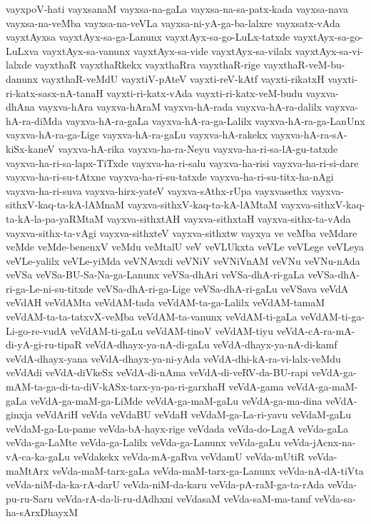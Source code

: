 {vayxpoV-hati
vayxsanaM
vayxsa-na-gaLa
vayxsa-na-sa-patx-kada
vayxsa-nava
vayxsa-na-veMba
vayxsa-na-veVLa
vayxsa-ni-yA-ga-ba-lalxre
vayxsatx-vAda
vayxtAyxsa
vayxtAyx-sa-ga-Lanunx
vayxtAyx-sa-go-LuLx-tatxde
vayxtAyx-sa-go-LuLxva
vayxtAyx-sa-vanunx
vayxtAyx-sa-vide
vayxtAyx-sa-vilalx
vayxtAyx-sa-vi-lalxde
vayxthaR
vayxthaRkekx
vayxthaRra
vayxthaR-rige
vayxthaR-veM-bu-danunx
vayxthaR-veMdU
vayxtiV-pAteV
vayxti-reV-kAtf
vayxti-rikatxH
vayxti-ri-katx-sasx-nA-tanaH
vayxti-ri-katx-vAda
vayxti-ri-katx-veM-budu
vayxva-dhAna
vayxva-hAra
vayxva-hAraM
vayxva-hA-rada
vayxva-hA-ra-dalilx
vayxva-hA-ra-diMda
vayxva-hA-ra-gaLa
vayxva-hA-ra-ga-Lalilx
vayxva-hA-ra-ga-LanUnx
vayxva-hA-ra-ga-Lige
vayxva-hA-ra-gaLu
vayxva-hA-rakekx
vayxva-hA-ra-sA-kiSx-kaneV
vayxva-hA-rika
vayxva-ha-ra-Neyu
vayxva-ha-ri-sa-lA-gu-tatxde
vayxva-ha-ri-sa-lapx-TiTxde
vayxva-ha-ri-salu
vayxva-ha-risi
vayxva-ha-ri-si-dare
vayxva-ha-ri-su-tAtxne
vayxva-ha-ri-su-tatxde
vayxva-ha-ri-su-titx-ha-nAgi
vayxva-ha-ri-suva
vayxva-hirx-yateV
vayxva-sAthx-rUpa
vayxvasethx
vayxva-sithxV-kaq-ta-kA-lAMnaM
vayxva-sithxV-kaq-ta-kA-lAMtaM
vayxva-sithxV-kaq-ta-kA-la-pa-yaRMtaM
vayxva-sithxtAH
vayxva-sithxtaH
vayxva-sithx-ta-vAda
vayxva-sithx-ta-vAgi
vayxva-sithxteV
vayxva-sithxtw
vayxya
ve
veMba
veMdare
veMde
veMde-benenxV
veMdu
veMtalU
veV
veVLUkxta
veVLe
veVLege
veVLeya
veVLe-yalilx
veVLe-yiMda
veVNAvxdi
veVNiV
veVNiVnAM
veVNu
veVNu-nAda
veVSa
veVSa-BU-Sa-Na-ga-Lanunx
veVSa-dhAri
veVSa-dhA-ri-gaLa
veVSa-dhA-ri-ga-Le-ni-su-titxde
veVSa-dhA-ri-ga-Lige
veVSa-dhA-ri-gaLu
veVSava
veVdA
veVdAH
veVdAMta
veVdAM-tada
veVdAM-ta-ga-Lalilx
veVdAM-tamaM
veVdAM-ta-ta-tatxvX-veMba
veVdAM-ta-vanunx
veVdAM-ti-gaLa
veVdAM-ti-ga-Li-go-re-vudA
veVdAM-ti-gaLu
veVdAM-tinoV
veVdAM-tiyu
veVdA-cA-ra-mA-di-yA-gi-ru-tipaR
veVdA-dhayx-ya-nA-di-gaLu
veVdA-dhayx-ya-nA-di-kamf
veVdA-dhayx-yana
veVdA-dhayx-ya-ni-yAda
veVdA-dhi-kA-ra-vi-lalx-veMdu
veVdAdi
veVdA-diVkeSx
veVdA-di-nAma
veVdA-di-veRV-da-BU-rapi
veVdA-ga-mAM-ta-ga-di-ta-diV-kASx-tarx-ya-pa-ri-garxhaH
veVdA-gama
veVdA-ga-maM-gaLa
veVdA-ga-maM-ga-LiMde
veVdA-ga-maM-gaLu
veVdA-ga-ma-dina
veVdA-ginxja
veVdAriH
veVda
veVdaBU
veVdaH
veVdaM-ga-La-ri-yavu
veVdaM-gaLu
veVdaM-ga-Lu-pame
veVda-bA-hayx-rige
veVdada
veVda-do-LagA
veVda-gaLa
veVda-ga-LaMte
veVda-ga-Lalilx
veVda-ga-Lanunx
veVda-gaLu
veVda-jAcnx-na-vA-ca-ka-gaLu
veVdakekx
veVda-mA-gaRva
veVdamU
veVda-mUtiR
veVda-maMtArx
veVda-maM-tarx-gaLa
veVda-maM-tarx-ga-Lanunx
veVda-nA-dA-tiVta
veVda-niM-da-ka-rA-darU
veVda-niM-da-karu
veVda-pA-raM-ga-ta-rAda
veVda-pu-ru-Saru
veVda-rA-da-li-ru-dAdhxni
veVdasaM
veVda-saM-ma-tamf
veVda-sa-ha-sArxDhayxM
}
